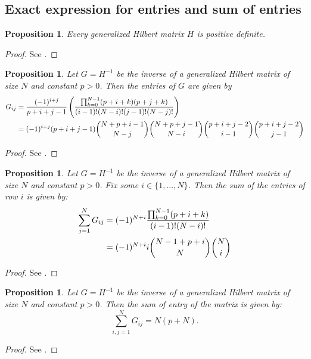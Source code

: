 \documentclass{article}
\newtheorem{prop}[thm]{Proposition}
\theoremstyle{definition}
\theoremstyle{remark}
\numberwithin{equation}{section}
\begin{document}
\subsection{Exact expression for entries and sum of entries}
\begin{prop}\label{hilbert-matrices-are-positive-definite}
Every generalized Hilbert matrix $H$ is positive definite. 
\end{prop}
\begin{proof} See \cite{collar1940reciprocation}.
\end{proof}

\begin{prop}\label{inverse-hilbert-matrix-entry}
Let $G=H^{-1}$ be the inverse of a generalized Hilbert matrix of size $N$ and constant $p>0$. Then the entries of $G$ are given by 
\begin{align}\label{entries}
 G_{ij} &= \frac{(-1)^{i+j}}{p+i+j-1} \left( \frac{\prod_{k=0}^{N-1} (p+i+k)(p+j+k)}{(i-1)! (N-i)! (j-1)! (N-j)!}\right) \\ 
 &= \label{entries-combinatorial-form} (-1)^{i+j} (p+i+j-1) \dbinom{N+p+i-1}{N-j} \dbinom{N+p+j-1}{N-i} \dbinom{p+i+j-2}{i-1} \dbinom{p+i+j-2}{j-1}
\end{align}
\end{prop}
\begin{proof} See \cite{collar1940reciprocation}.
\end{proof}

\begin{prop}\label{inverse-hilbert-matrix-row}
Let $G=H^{-1}$ be the inverse of a generalized Hilbert matrix of size $N$ and constant $p>0$. Fix some $i \in \{1,...,N\}$. Then the sum of the entries of row $i$ is given by: 
\begin{align}\label{sum-of-row}
\sum_{j=1}^N G_{ij} &= (-1)^{N+i} \frac{\prod_{k=0}^{N-1} (p+i+k)}{(i-1)! (N-i)!} \\
&= (-1)^{N+i} i \dbinom{N-1+p+i}{N} \dbinom{N}{i} \label{sum-of-row-combinatorial-form}
\end{align}
\end{prop}
\begin{proof} See \cite{smith1959inversion}.
\end{proof}

\begin{prop}\label{inverse-hilbert-matrix-total} 
Let $G=H^{-1}$ be the inverse of a generalized Hilbert matrix of size $N$ and constant $p>0$. Then the sum of entry of the matrix is given by:
\begin{equation}\label{total-sum}
\sum_{i,j=1}^N G_{ij} = N(p+N).
\end{equation}
\end{prop} 
\begin{proof} See \cite{smith1959inversion}.
\end{proof}
\end{document}
